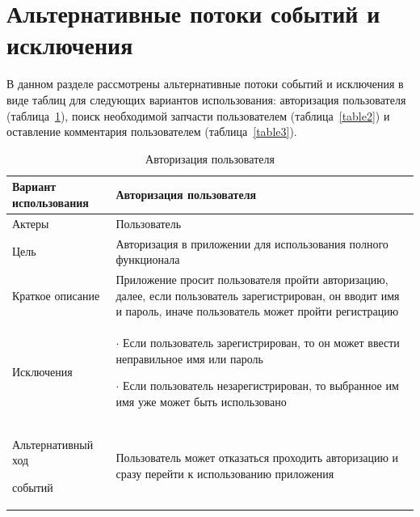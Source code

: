\documentclass[14pt]{extreport}
\begin{document}
\newpage
\section{Альтернативные потоки событий и исключения}

В данном разделе рассмотрены альтернативные потоки событий и исключения в виде таблиц для следующих вариантов использования: авторизация пользователя (таблица~\ref{table1}), поиск необходимой запчасти пользователем (таблица~\ref{table2}) и оставление комментария пользователем (таблица~\ref{table3}).

\begin{table}[H]

\begin{center}
\caption{Авторизация пользователя \label{table1}}
\begin{tabular}{|p{5.5cm}|p{10.7cm}|}
\hline
Вариант использования & Авторизация пользователя \\
\hline
Актеры
 & Пользователь
 \\
\hline
Цель
 & Авторизация в приложении для использования полного функционала 
 \\
\hline
Краткое описание
 & Приложение просит пользователя пройти авторизацию, далее, если пользователь зарегистрирован, он вводит имя и пароль, иначе пользователь может пройти регистрацию
 \\
\hline
Исключения
 & 
$\cdot$ Если пользователь зарегистрирован, то он может ввести неправильное имя или пароль

$\cdot$ Если пользователь незарегистрирован, то выбранное им имя уже может быть использовано
 \\
\hline
Альтернативный ход 

событий
& Пользователь может отказаться проходить авторизацию и сразу перейти к использованию приложения \\

\hline
\end{tabular}
\end{center}
\end{table}
\end{document}

